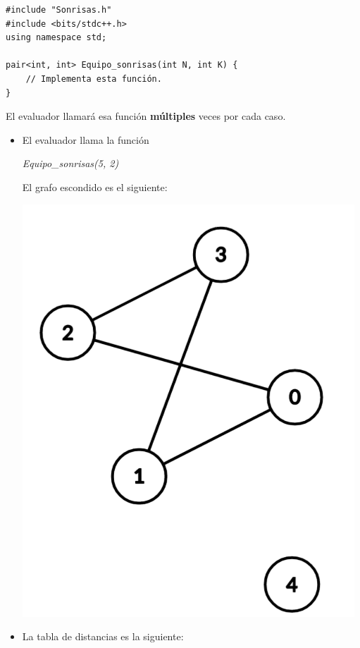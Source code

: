 \documentclass[12pt]{scrartcl}
\begin{document}
\begin{verbatim}
#include "Sonrisas.h"
#include <bits/stdc++.h>
using namespace std;

pair<int, int> Equipo_sonrisas(int N, int K) {
    // Implementa esta función.
}

\end{verbatim}

    El evaluador llamará esa función \textbf{múltiples} veces por cada caso.
    

        \begin{itemize}
            \item El evaluador llama la función 
            \begin{center}
                \textit{Equipo\_sonrisas(5, 2)}
            \end{center}
            El grafo escondido es el siguiente:
            \begin{center}
                \includegraphics[scale=0.3]{ej1.png}
            \end{center}
            \item La tabla de distancias es la siguiente:
            

\end{itemize}
\end{document}
